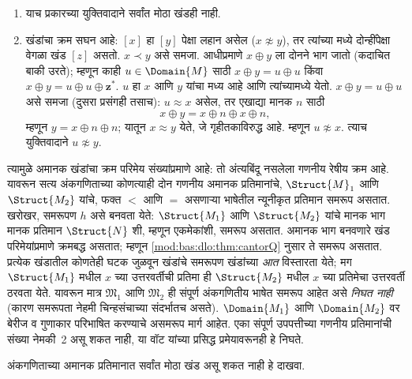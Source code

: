 \begin{enumerate}
\item याच प्रकारच्या युक्तिवादाने सर्वांत मोठा खंडही नाही.
\item खंडांचा क्रम सघन आहे: $[x]$ हा $[y]$
  पेक्षा लहान असेल ($x \not\approx y$), तर
  त्यांच्या मध्ये दोन्हींपेक्षा वेगळा खंड $[z]$
  असतो. $x \prec y$ असे समजा. आधीप्रमाणे
  $x \oplus y$ ला दोनने भाग जातो (कदाचित
  बाकी उरते); म्हणून काही $u \in \Domain{M}$
  साठी $x \oplus y = u \oplus u$ किंवा
  $x \oplus y = u \oplus u \oplus \mathbf{z}^*$.
  $u$ हा $x$ आणि $y$ यांचा मध्य आहे आणि
  त्यांच्यामध्ये येतो. $x \oplus y = u \oplus u$
  असे समजा (दुसरा प्रसंगही तसाच): $u \approx x$
  असेल, तर एखाद्या मानक $n$ साठी
  \[
  x \oplus y = x \oplus n \oplus x \oplus n,
  \]
  म्हणून $y = x \oplus n \oplus n$; यातून
  $x \approx y$ येते, जे गृहीतकाविरुद्ध आहे.
  म्हणून $u \not\approx x$. त्याच युक्तिवादाने
  $u \not\approx y$.
\end{enumerate}
त्यामुळे अमानक खंडांचा क्रम परिमेय संख्यांप्रमाणे
आहे: तो अंत्यबिंदू नसलेला गणनीय रेषीय क्रम आहे.
यावरून सत्य अंकगणिताच्या कोणत्याही दोन
गणनीय अमानक प्रतिमानांचे,
$\Struct{M}_1$ आणि $\Struct{M_2}$ यांचे,
फक्त $<$ आणि $=$ असणाऱ्या भाषेतील
न्यूनीकृत प्रतिमान समरूप असतात.
खरोखर, समरूपण $h$ असे बनवता येते:
$\Struct{M_1}$ आणि $\Struct{M_2}$ यांचे
मानक भाग मानक प्रतिमान $\Struct{N}$ शी,
म्हणून एकमेकांशी, समरूप असतात. अमानक भाग
बनवणारे खंड परिमेयांप्रमाणे क्रमबद्ध असतात;
म्हणून \ref{mod:bas:dlo:thm:cantorQ} नुसार ते
समरूप असतात. प्रत्येक खंडातील कोणतेही
घटक जुळवून खंडांचे समरूपण खंडांच्या
\emph{आत} विस्तारता येते; मग
$\Struct{M_1}$ मधील $x$ च्या उत्तरवर्तीची
प्रतिमा ही $\Struct{M_2}$ मधील $x$ च्या
प्रतिमेचा उत्तरवर्ती ठरवता येते.
यावरून मात्र $\mathfrak{M}_1$ आणि
$\mathfrak{M}_2$ ही संपूर्ण अंकगणितीय
भाषेत समरूप आहेत असे \emph{निघत नाही}
(कारण समरूपता नेहमी चिन्हसंचाच्या संदर्भातच
असते). $\Domain{M_1}$ आणि $\Domain{M_2}$
वर बेरीज व गुणाकार परिभाषित करण्याचे
असमरूप मार्ग आहेत. एका संपूर्ण उपपत्तीच्या
गणनीय प्रतिमानांची संख्या नेमकी~2
असू शकत नाही, या वॉट यांच्या प्रसिद्ध
प्रमेयावरूनही हे निघते.

\begin{prob}
अंकगणिताच्या अमानक प्रतिमानात सर्वांत मोठा
खंड असू शकत नाही हे दाखवा.
\end{prob}

